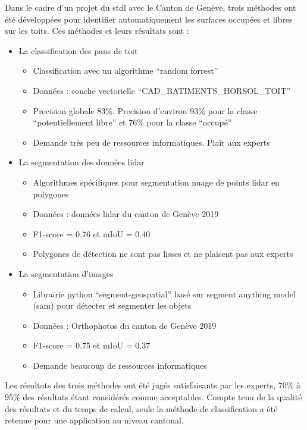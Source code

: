 \par{Dans le cadre d'un projet \cite{herny_detection_2024} du \acrshort{stdl} avec le Canton de Genève, trois méthodes ont été développées pour identifier automatiquement les surfaces occupées et libres sur les toits. Ces méthodes et leurs résultats sont :}
\begin{itemize}
    \item La classification des pans de toit
    \begin{itemize}
        \item Classification avec un algorithme ``random forrest''
        \item Données : couche vectorielle ``CAD\_BATIMENTS\_HORSOL\_TOIT'' \cite{sitg_toits_nodate}
        \item Precision globale 83\%. Precision d'environ 93\% pour la classe ``potentiellement libre'' et 76\% pour la classe ``occupé''
        \item Demande très peu de ressources informatiques. Plaît aux experts
    \end{itemize}
    \item La segmentation des données \gls{lidar}
    \begin{itemize}
        \item Algorithmes spécifiques pour segmentation nuage de points \gls{lidar} en polygones
        \item Données : données \gls{lidar} du canton de Genève 2019 \cite{sitg_nuages_2019}
        \item F1-score = 0.76 et mIoU = 0.40
        \item Polygones de détection ne sont pas lisses et ne plaisent pas aux experts
    \end{itemize}
    \item La segmentation d'images
    \begin{itemize}
        \item Librairie python ``segment-geospatial'' \cite{wu_samgeo_2023} basé sur segment anything model (\acrshort{sam}) pour détecter et segmenter les objets
        \item Données : Orthophotos du canton de Genève 2019 \cite{sitg_orthophotos_nodate}
        \item F1-score = 0.75 et mIoU = 0.37
        \item Demande beaucoup de ressources informatiques
    \end{itemize}
\end{itemize}

\par{Les résultats des trois méthodes ont été jugés satisfaisants par les experts, 70\% à 95\% des résultats étant considérés comme acceptables. Compte tenu de la qualité des résultats et du temps de calcul, seule la méthode de classification a été retenue pour une application au niveau cantonal.}


